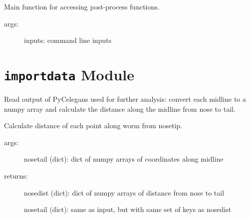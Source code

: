 \documentclass[letterpaper,10pt,openany,oneside]{sphinxmanual}
\begin{document}
\begin{fulllineitems}
\label{index:postprocess.main}
Main function for accessing post-process functions.
\begin{description}
\item[{args:}] \leavevmode
inputs: command line inputs

\end{description}

\end{fulllineitems}



\chapter{\texttt{importdata} Module}
\label{index:importdata-module}\label{index:module-importdata}
Read output of PyCelegans used for further analysis: convert each midline to 
a numpy array and calculate the distance along the midline from nose to tail.

\begin{fulllineitems}
\label{index:importdata.getnosedist}
Calculate distance of each point along worm from nosetip.
\begin{description}
\item[{args:}] \leavevmode
nosetail (dict): dict of numpy arrays of coordinates along midline

\item[{returns:}] \leavevmode
nosedist (dict): dict of numpy arrays of distance from nose to tail

nosetail (dict): same as input, but with same set of keys as nosedist

\end{description}

\end{fulllineitems}

\end{document}
